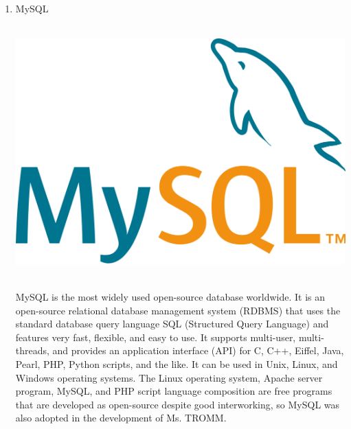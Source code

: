 \documentclass[conference]{IEEEtran}
\begin{document}
\begin{enumerate}
    \item MySQL \\ \\
    \centerline{\includegraphics[scale=0.1]{assets/MySQL.png}}
    \\ MySQL is the most widely used open-source database worldwide. It is an open-source relational database management system (RDBMS) that uses the standard database query language SQL (Structured Query Language) and features very fast, flexible, and easy to use. It supports multi-user, multi-threads, and provides an application interface (API) for C, C++, Eiffel, Java, Pearl, PHP, Python scripts, and the like. It can be used in Unix, Linux, and Windows operating systems. The Linux operating system, Apache server program, MySQL, and PHP script language composition are free programs that are developed as open-source despite good interworking, so MySQL was also adopted in the development of Ms. TROMM.\\ \\ 
    

\end{enumerate}
\end{document}
